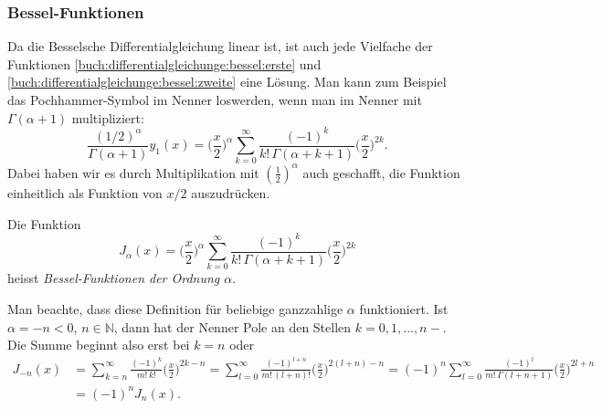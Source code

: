 \subsubsection{Bessel-Funktionen}
Da die Besselsche Differentialgleichung linear ist, ist auch
jede Vielfache der Funktionen
\eqref{buch:differentialgleichunge:bessel:erste}
und
\eqref{buch:differentialgleichunge:bessel:zweite}
eine Lösung.
Man kann zum Beispiel das Pochhammer-Symbol im Nenner loswerden,
wenn man im Nenner mit $\Gamma(\alpha+1)$
multipliziert:
\[
\frac{(1/2)^\alpha}{\Gamma(\alpha+1)}
y_1(x)
=
\biggl(\frac{x}{2}\biggr)^\alpha
\sum_{k=0}^\infty
\frac{(-1)^k}{k!\,\Gamma(\alpha+k+1)}
\biggl(\frac{x}{2}\biggr)^{2k}.
\]
Dabei haben wir es durch
Multiplikation mit $(\frac12)^\alpha$ auch geschafft, die Funktion
einheitlich als Funktion von $x/2$ auszudrücken.

\begin{definition}
\label{buch:differentialgleichungen:bessel:definition}
Die Funktion
\[
J_{\alpha}(x)
=
\biggl(\frac{x}{2}\biggr)^\alpha
\sum_{k=0}^\infty
\frac{(-1)^k}{k!\,\Gamma(\alpha+k+1)}
\biggl(\frac{x}{2}\biggr)^{2k}
\]
heisst {\em Bessel-Funktionen der Ordnung $\alpha$}.
\end{definition}

Man beachte, dass diese Definition für beliebige ganzzahlige 
$\alpha$ funktioniert.
Ist $\alpha=-n<0$, $n\in\mathbb{N}$, dann hat der Nenner Pole 
an den Stellen $k=0,1,\dots,n-$.
Die Summe beginnt also erst bei $k=n$ oder
\begin{align*}
J_{-n}(x)
&=
\sum_{k=n}^\infty \frac{(-1)^k}{m!\,k!}\biggl(\frac{x}{2}\biggr)^{2k-n}
=
\sum_{l=0}^\infty
\frac{(-1)^{l+n}}{m!\,(l+n)!}\biggl(\frac{x}{2}\biggr)^{2(l+n)-n}
=
(-1)^n
\sum_{l=0}^\infty
\frac{(-1)^l}{m!\,\Gamma(l+n+1)}\biggl(\frac{x}{2}\biggr)^{2l+n}
\\
&=
(-1)^n
J_{n}(x).
\end{align*}

